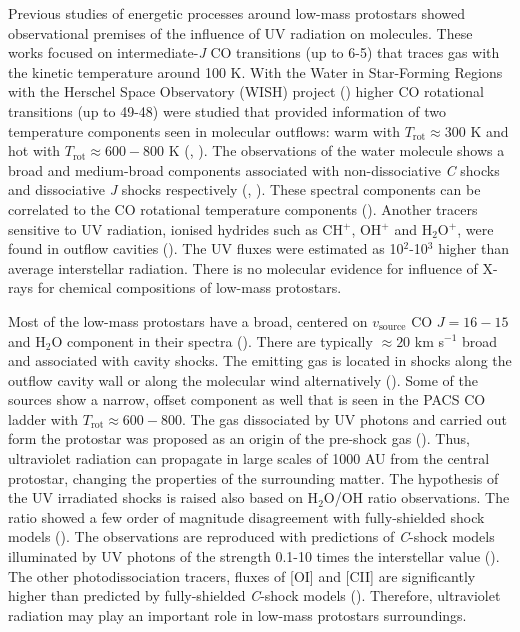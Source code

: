\documentclass{aa}
\begin{document}
Previous studies of energetic processes around low-mass protostars showed observational premises of the influence of UV radiation on molecules. These works focused on intermediate-\textit{J} CO transitions (up to 6-5) that traces gas with the kinetic temperature around 100 K. With the Water in Star-Forming Regions with the Herschel Space Observatory (WISH) project (\citealt{vDi11}) higher CO rotational transitions (up to 49-48) were studied that provided information of two temperature components seen in molecular outflows: warm with $T_\mathrm{rot} \approx 300$ K and hot with $T_\mathrm{rot} \approx 600-800$ K (\citealt{Kar13}, \citealt{Gre13}). The observations of the water molecule shows a broad and medium-broad components associated with non-dissociative \textit{C} shocks and dissociative \textit{J} shocks respectively (\citealt{Kri13}, \citealt{Mot14}). These spectral components can be correlated to the CO rotational temperature components (\citealt{Kri17}). Another tracers sensitive to UV radiation, ionised hydrides such as CH$^+$, OH$^+$ and H$_2$O$^+$, were found in outflow cavities (\citealt{Ben16}). The UV fluxes were estimated as 10$^2$-10$^3$ higher than average interstellar radiation. There is no molecular evidence for influence of X-rays for chemical compositions of low-mass protostars. 

Most of the low-mass protostars have a broad, centered on $v_{\mathrm{source}}$ CO $J=16-15$ and H$_2$O component in their spectra (\citealt{Kri17}). There are typically $\approx 20$ km s$^{-1}$ broad and associated with cavity shocks. The emitting gas is located in shocks along the outflow cavity wall or along the molecular wind alternatively (\citealt{Yva16}). Some of the sources show a narrow, offset component as well that is seen in the PACS CO ladder with $T_\mathrm{rot} \approx 600-800$. The gas dissociated by UV photons and carried out form the protostar was proposed as an origin of the pre-shock gas (\citealt{Kri17}). Thus, ultraviolet radiation can propagate in large scales of 1000 AU from the central protostar, changing the properties of the surrounding matter. The hypothesis of the UV irradiated shocks is raised also based on H$_2$O/OH ratio observations. The ratio showed a few order of magnitude disagreement with fully-shielded shock models (\citealt{Kar14}). The observations are reproduced with predictions of \textit{C}-shock models illuminated by UV photons of the strength 0.1-10 times the interstellar value (\citealt{Mel15}). The other photodissociation tracers, fluxes of [OI] and [CII] are significantly higher than predicted by fully-shielded \textit{C}-shock models (\citealt{Kar18}). Therefore, ultraviolet radiation may play an important role in low-mass protostars surroundings. 
\end{document}
